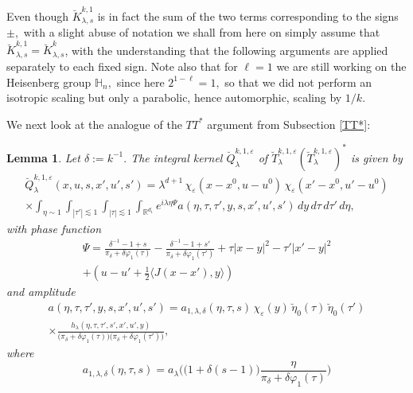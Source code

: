 \documentclass[leqno]{amsart}
\newtheorem{lemma}[theorem]{Lemma}
\theoremstyle{definition}
\theoremstyle{remark}
\numberwithin{equation}{section}
\newcommand{\R}{\mathbb{R}}
\newcommand\la{{\lambda}}
\newcommand\de{{\delta}}
\begin{document}
Even though $\breve K_{\lambda,s}^{k,1}$ is in fact the sum of the two terms corresponding to the signs $\pm,$ with  a slight abuse of notation we shall from here on simply assume that $\breve K_{\lambda,s}^{k,1}=\breve K_{\lambda,s}^k$, with the understanding that the following arguments are applied separately to each fixed sign. Note also that for $\ell=1$ we  are still working on the Heisenberg group $\mathbb H_n,$ since  here $2^{1-\ell}=1,$ so that we did not  perform an isotropic scaling but only a parabolic, hence automorphic, scaling by $1/k$.

\medskip

We next look at the analogue of the $TT^*$ argument from Subsection \ref{TT*}:

\begin{lemma}\label{lem:k1-TTstar} 
Let $\delta:=k^{-1}.$ The integral kernel $\breve Q^{k,1,\varepsilon}_{\lambda}$ of $\breve T^{k,1,\varepsilon}_\lambda(\breve T^{k,1,\varepsilon}_\lambda)^*$ is given by
\begin{multline}\label{eq:Qk1}
\breve Q^{k,1,\varepsilon}_{\lambda}(x,u,s,x',u',s')
 = \lambda^{d+1}\,\chi_\varepsilon(x-x^0,u-u^0)\,\chi_\varepsilon(x'-x^0,u'-u^0) \\ \times \int_{\eta\sim 1} \int_{|\tau'|\lesssim 1}\int_{|\tau|\lesssim 1} \int_{\R^{d_1}} e^{i\lambda \eta \Psi} a(\eta,\tau,\tau',y,s,x',u',s')\,dy \,d\tau\, d\tau'\, d\eta, 
\end{multline}
with phase function
\begin{multline}
\Psi = \frac{\delta^{-1}-1 + s}{\pi_\delta + \delta \varphi_1(\tau)}
 - \frac{\delta^{-1}-1 + s'}{\pi_\delta+ \delta \varphi_1(\tau')} 
 +\tau | x-y|^2 - \tau'| x'-y|^2  \\
 +( u - u' + \tfrac 1 2 \langle J(x-x'),y\rangle) \label{eq:Psi-k1}
\end{multline}
and amplitude
\begin{multline}\label{eq:k1-TTstar-amplitude}
a(\eta,\tau,\tau',y,s,x',u',s')
=a_{1,\la,\de}(\eta,\tau,s)\,\chi_\varepsilon(y)\,\breve\eta_0(\tau)\,\breve\eta_0(\tau') \\
\times \frac{h_\lambda(\eta,\tau,\tau',s',x',u',y)}{\big(\pi_\delta+\delta\varphi_1(\tau)\big) \big(\pi_\delta+\delta\varphi_1(\tau')\big)},
\end{multline}
where
\begin{equation}\label{eq:k1-TTstar-a}
a_{1,\la,\de}(\eta,\tau,s)
= a_\la\Big(\big(1+\delta(s-1)\big)
\frac{\eta}{\pi_\delta+\delta\varphi_1(\tau)}\Big)
\end{equation}

\end{lemma}
\end{document}
